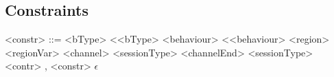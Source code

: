 \documentclass[12pt]{article}
\begin{document}
\subsection{Constraints}

\begin{grammar}

<constr> ::= <bType> \textless <bType>
\alt <behaviour> \textless <behaviour>
\alt <region> \texttildelow <regionVar>
\alt <channel> \texttildelow <sessionType>
\alt <channelEnd> \texttildelow <sessionType>
\alt <contr> , <constr>
\alt $\epsilon$

\end{grammar}
\end{document}
